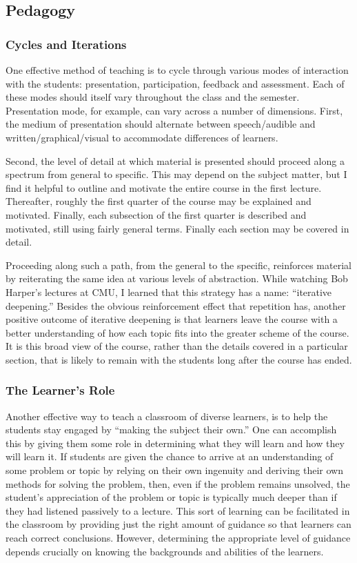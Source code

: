 \subsection{Pedagogy}

\smallskip

\subsubsection{Cycles and Iterations}
One effective method of teaching is to cycle through
various modes of interaction with the students:
presentation, participation, feedback and assessment. 
Each of these modes should itself vary throughout the class and the semester.
Presentation mode, for example, can vary across a number of
dimensions.
First, the medium of presentation should
alternate between speech/audible and written/graphical/visual to
accommodate differences of learners.

Second, the
level of detail at which material is presented should proceed along a
spectrum from general to specific.  This may depend on the subject matter,
but I find it helpful to outline and motivate the entire course 
in the first lecture.  Thereafter, roughly the first quarter of
the course may be explained and motivated.  Finally, each subsection
of the first quarter is described and motivated, still using
fairly general terms. Finally each section may be covered in detail.

Proceeding along such a path, from the general to the specific, reinforces material by reiterating the same idea at various levels of abstraction. While watching Bob Harper's lectures at CMU, I learned that this strategy has a name: ``iterative deepening.'' Besides the obvious reinforcement effect that repetition has, another positive outcome of iterative deepening is that learners leave the course with a better understanding of how each topic fits into the greater scheme of the course. It is this broad view of the course, rather than the details covered in a particular section, that is likely to remain with the students long after the course has ended.

\subsubsection{The Learner's Role}
Another effective way to teach a classroom of diverse learners, is to help the students stay engaged by ``making the subject their own.''  One can accomplish this by giving them some role in determining what they will learn and how they will learn it.  If students are given the chance to arrive at an understanding of some problem or topic by relying on their own ingenuity and deriving their own methods
for solving the problem, then, even if the problem remains unsolved, the student's appreciation of the problem or topic is typically much deeper than if they had listened passively to a lecture. %
This sort of learning can be facilitated in the classroom by providing just the right amount of guidance so that learners can reach correct conclusions.  However, determining the appropriate level of guidance depends crucially on knowing the backgrounds and abilities of the learners.

